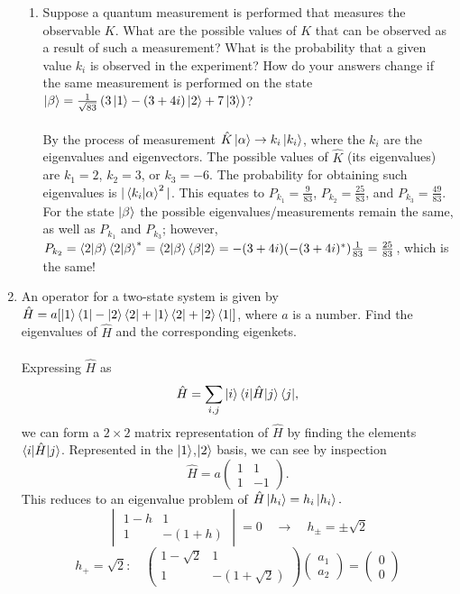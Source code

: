 \documentclass[11pt,letterpaper]{article}
\begin{document}
\begin{enumerate}
\begin{enumerate}
  \item Suppose a quantum measurement is performed that measures the observable $K$. What are the possible values of $K$ that can be observed as a result of such a measurement? What is the probability that a given value $k_i$ is observed in the experiment? How do your answers change if the same measurement is performed on the state $\ket \beta = \frac{1}{\sqrt{83}}\left(3\ket 1 -(3+4i)\ket 2 + 7 \ket 3\right)$?
  \\ \\By the process of measurement $\hat K\ket\alpha \rightarrow k_i\ket{k_i}$, where the $k_i$ are the eigenvalues and eigenvectors. The possible values of $\hat K$ (its eigenvalues) are $k_1 = 2$, $k_2=3$, or $k_3=-6$. The probability for obtaining such eigenvalues is $|\braket{k_i|\alpha}^2|$. This equates to $P_{k_1} = \frac{9}{83}$, $P_{k_2}=\frac{25}{83}$, and $P_{k_3}=\frac{49}{83}$. For the state $\ket \beta$ the possible eigenvalues/measurements remain the same, as well as $P_{k_1}$ and $P_{k_3}$; however, $P_{k_2} = \braket{2|\beta}\braket{2|\beta}^* = \braket{2|\beta}\braket{\beta|2} = -(3+4i)(-(3+4i)^*)\frac{1}{83} = \frac{25}{83}$, which is the same! 
  \end{enumerate}
\item An operator for a two-state system is given by $\hat H = a[\ket 1\bra 1 - \ket 2\bra 2 + \ket1\bra 2 + \ket 2\bra 1]$, where $a$ is a number. Find the eigenvalues of $\hat H$ and the corresponding eigenkets.
\\ \\ Expressing $\hat H$ as 
$$\hat H = \sum_{i,j}{\ket i \braket{i|\hat H|j}\bra j},$$
we can form a $2\times2$ matrix representation of $\hat H$ by finding the elements $\braket{i|\hat H|j}$. Represented in the $\ket 1$,$\ket 2$ basis, we can see by inspection
$$\hat H = a\begin{pmatrix}1&1\\1&-1\end{pmatrix}.$$
This reduces to an eigenvalue problem of $\hat H\ket{h_i} = h_i\ket{h_i}.$
$$\begin{vmatrix}1-h&1\\1&-(1+h)\end{vmatrix} = 0 \quad \rightarrow \quad h_{\pm}=\pm\sqrt2$$
$$h_+ = \sqrt2 : \quad \begin{pmatrix}1-\sqrt2&1\\1&-(1+\sqrt2)\end{pmatrix}\begin{pmatrix}a_1\\a_2\end{pmatrix} = \begin{pmatrix}0\\0\end{pmatrix}$$

\end{enumerate}
\end{document}
